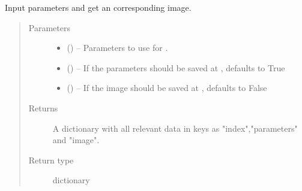 \documentclass[letterpaper,10pt,english]{sphinxmanual}
\begin{document}
\begin{fulllineitems}

\begin{fulllineitems}
\label{\detokenize{index:dataset.dataset_cuboids.parameters_to_finished_data}}
Input parameters and get an corresponding image.
\begin{quote}\begin{description}
\item[{Parameters}] \leavevmode\begin{itemize}
\item {} 
 () -- Parameters to use for {\hyperref[\detokenize{index:dataset.dataset_cuboids.create_json_string_from_parameters}]{}}.

\item {} 
 (\sphinxstyleliteralemphasis{\sphinxupquote{, }}) -- If the parameters should be saved at , defaults to True

\item {} 
 (\sphinxstyleliteralemphasis{\sphinxupquote{, }}) -- If the image should be saved at , defaults to False

\end{itemize}

\item[{Returns}] \leavevmode
A dictionary with all relevant data in keys as "index","parameters" and "image".

\item[{Return type}] \leavevmode
dictionary

\end{description}\end{quote}

\end{fulllineitems}


\end{fulllineitems}
\end{document}
